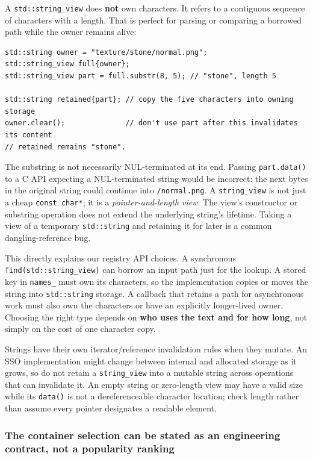 A \texttt{std::string\_view} does \textbf{not} own characters. It refers to a contiguous sequence of characters with a length. That is perfect for parsing or comparing a borrowed path while the owner remains alive:

\begin{verbatim}
std::string owner = "texture/stone/normal.png";
std::string_view full{owner};
std::string_view part = full.substr(8, 5); // "stone", length 5

std::string retained{part}; // copy the five characters into owning storage
owner.clear();              // don't use part after this invalidates its content
// retained remains "stone".
\end{verbatim}

The substring is not necessarily NUL-terminated at its end. Passing \texttt{part.data()} to a C API expecting a NUL-terminated string would be incorrect: the next bytes in the original string could continue into \texttt{/normal.png}. A \texttt{string\_view} is not just a cheap \texttt{const\ char*}; it is a \emph{pointer-and-length view}. The view's constructor or substring operation does not extend the underlying string's lifetime. Taking a view of a temporary \texttt{std::string} and retaining it for later is a common dangling-reference bug.

This directly explains our registry API choices. A synchronous \texttt{find(std::string\_view)} can borrow an input path just for the lookup. A stored key in \texttt{names\_} must own its characters, so the implementation copies or moves the string into \texttt{std::string} storage. A callback that retains a path for asynchronous work must also own the characters or have an explicitly longer-lived owner. Choosing the right type depends on \textbf{who uses the text and for how long}, not simply on the cost of one character copy.

Strings have their own iterator/reference invalidation rules when they mutate. An SSO implementation might change between internal and allocated storage as it grows, so do not retain a \texttt{string\_view} into a mutable string across operations that can invalidate it. An empty string or zero-length view may have a valid size while its \texttt{data()} is not a dereferenceable character location; check length rather than assume every pointer designates a readable element.

\subsubsection{The container selection can be stated as an engineering contract, not a popularity ranking}\label{the-container-selection-can-be-stated-as-an-engineering-contract-not-a-popularity-ranking}

